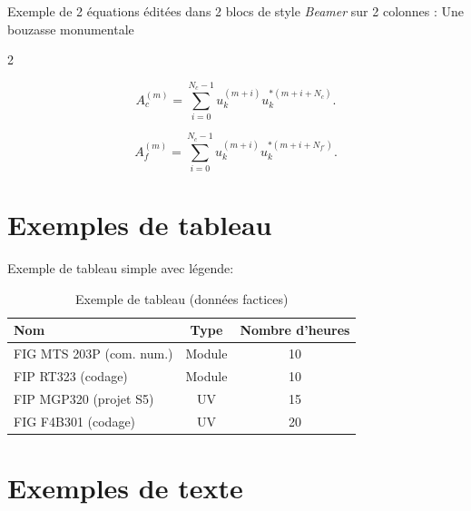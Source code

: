 \documentclass[11pt,a4paper,french]{article}
\begin{document}
Exemple de 2 équations éditées dans 2 blocs de style \emph{Beamer} sur 2 colonnes : Une bouzasse monumentale 

\begin{multicols}{2}
	
	\begin{beamerblock}{}
		\begin{equation}
		A_c^{(m)} = \sum_{i=0}^{N_c-1}u_k^{(m+i)}u_k^{*(m+i+N_c)}.
		\end{equation}
	\end{beamerblock}
	
	\begin{beamerblock}{}
		\begin{equation}
		A_f^{(m)} = \sum_{i=0}^{N_c-1}u_k^{(m+i)}u_k^{*(m+i+N_{f\prime})}.
		\end{equation}
	\end{beamerblock}
	
\end{multicols}

\newpage
\section{Exemples de tableau}\label{sec:S_TAB}

Exemple de tableau simple avec légende:

\begin{table}[htb]
	\centering
	\begin{tabular}{lcc}
		\toprule
		\textbf{Nom}             & \textbf{Type} & \textbf{Nombre d'heures} \\ \midrule
		FIG MTS 203P (com. num.) &    Module     &            10            \\
		FIP RT323 (codage)       &    Module     &            10            \\
		FIP MGP320 (projet S5)   &      UV       &            15            \\
		FIG F4B301 (codage)      &      UV       &            20            \\ \bottomrule
	\end{tabular}
	\caption{Exemple de tableau (données factices)} \label{tab:T_ENSEIGNEMENT}
\end{table}

\newpage
\section{Exemples de texte}\label{sec:S_TEXT}
\end{document}
